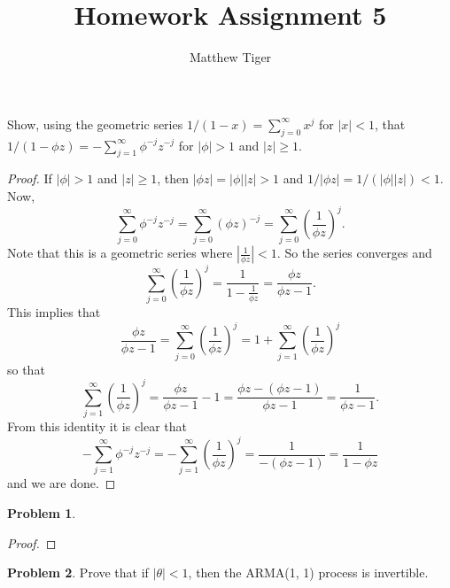\documentclass[12pt]{article}
\title{Homework Assignment 5}
\author{Matthew Tiger}
\theoremstyle{definition}
\newtheorem{problem}{Problem}
\newenvironment{custompbm}[1]
  {\renewcommand\theproblem{#1}\problem}
  {\endproblem}
\begin{document}
\maketitle


\begin{custompbm}{2.7}
   Show, using the geometric series $1/(1-x) = \sum_{j=0}^\infty x^j$ for $|x| < 1$,
   that $1/(1-\phi z) = -\sum_{j=1}^\infty \phi^{-j} z^{-j}$ for $|\phi| > 1$ and $|z| \geq 1$.
\end{custompbm}

\begin{proof}
  If $|\phi| > 1$ and $|z| \geq 1$, then $|\phi z| = |\phi| |z| > 1$ and
  $1 / |\phi z| = 1 / (|\phi| |z|) < 1$. Now,
  \[
    \sum_{j=0}^\infty \phi^{-j} z ^ {-j} = \sum_{j=0}^\infty (\phi z )^{-j} = \sum_{j=0}^\infty \left(\frac{1}{\phi z}\right)^j.
  \]
  Note that this is a geometric series where $|\frac{1}{\phi z}| < 1$. So the
  series converges and
  \[
    \sum_{j=0}^\infty \left(\frac{1}{\phi z}\right)^j = \frac{1}{1 - \frac{1}{\phi z}} = \frac{\phi z}{\phi z - 1}.
  \]
  This implies that
  \[
    \frac{\phi z}{\phi z - 1}  = \sum_{j=0}^\infty \left(\frac{1}{\phi z}\right)^j = 1 + \sum_{j=1}^\infty \left(\frac{1}{\phi z}\right)^j
  \]
  so that
  \[
    \sum_{j=1}^\infty \left(\frac{1}{\phi z}\right)^j = \frac{\phi z}{\phi z - 1} - 1 = \frac{\phi z - (\phi z - 1)}{\phi z - 1} = \frac{1}{\phi z - 1}.
  \]
  From this identity it is clear that
  \[
    - \sum_{j=1}^\infty \phi^{-j} z ^ {-j} = - \sum_{j=1}^\infty \left(\frac{1}{\phi z}\right)^j = \frac{1}{-(\phi z -1)} = \frac{1}{1 - \phi z}
  \]
  and we are done.
\end{proof}


\begin{problem}
\end{problem}

\begin{proof}
\end{proof}


\begin{problem}
  Prove that if $|\theta| < 1$, then the ARMA(1, 1) process is invertible.
\end{problem}
\end{document}
